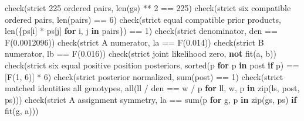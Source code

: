 \documentclass[
]{article}
\newenvironment{Shaded}{}{}
\newcommand{\BuiltInTok}[1]{\textcolor[rgb]{0.00,0.50,0.00}{#1}}
\newcommand{\ControlFlowTok}[1]{\textcolor[rgb]{0.00,0.44,0.13}{\textbf{#1}}}
\newcommand{\DecValTok}[1]{\textcolor[rgb]{0.25,0.63,0.44}{#1}}
\newcommand{\KeywordTok}[1]{\textcolor[rgb]{0.00,0.44,0.13}{\textbf{#1}}}
\newcommand{\NormalTok}[1]{#1}
\newcommand{\OperatorTok}[1]{\textcolor[rgb]{0.40,0.40,0.40}{#1}}
\newcommand{\StringTok}[1]{\textcolor[rgb]{0.25,0.44,0.63}{#1}}
\begin{document}
\begin{Shaded}
\begin{Highlighting}[]
\NormalTok{    check(}\StringTok{\textquotesingle{}strict 225 ordered pairs\textquotesingle{}}\NormalTok{, }\BuiltInTok{len}\NormalTok{(gs) }\OperatorTok{**} \DecValTok{2} \OperatorTok{==} \DecValTok{225}\NormalTok{)}
\NormalTok{    check(}\StringTok{\textquotesingle{}strict six compatible ordered pairs\textquotesingle{}}\NormalTok{, }\BuiltInTok{len}\NormalTok{(pairs) }\OperatorTok{==} \DecValTok{6}\NormalTok{)}
\NormalTok{    check(}\StringTok{\textquotesingle{}strict equal compatible prior products\textquotesingle{}}\NormalTok{,}
          \BuiltInTok{len}\NormalTok{(\{ps[i] }\OperatorTok{*}\NormalTok{ ps[j] }\ControlFlowTok{for}\NormalTok{ i, j }\KeywordTok{in}\NormalTok{ pairs\}) }\OperatorTok{==} \DecValTok{1}\NormalTok{)}
\NormalTok{    check(}\StringTok{\textquotesingle{}strict denominator\textquotesingle{}}\NormalTok{, den }\OperatorTok{==}\NormalTok{ F(}\StringTok{\textquotesingle{}0.0012096\textquotesingle{}}\NormalTok{))}
\NormalTok{    check(}\StringTok{\textquotesingle{}strict A numerator\textquotesingle{}}\NormalTok{, la }\OperatorTok{==}\NormalTok{ F(}\StringTok{\textquotesingle{}0.014\textquotesingle{}}\NormalTok{))}
\NormalTok{    check(}\StringTok{\textquotesingle{}strict B numerator\textquotesingle{}}\NormalTok{, lb }\OperatorTok{==}\NormalTok{ F(}\StringTok{\textquotesingle{}0.016\textquotesingle{}}\NormalTok{))}
\NormalTok{    check(}\StringTok{\textquotesingle{}strict joint likelihood zero\textquotesingle{}}\NormalTok{, }\KeywordTok{not}\NormalTok{ fit(a, b))}
\NormalTok{    check(}\StringTok{\textquotesingle{}strict six equal positive position posteriors\textquotesingle{}}\NormalTok{,}
          \BuiltInTok{sorted}\NormalTok{(p }\ControlFlowTok{for}\NormalTok{ p }\KeywordTok{in}\NormalTok{ post }\ControlFlowTok{if}\NormalTok{ p) }\OperatorTok{==}\NormalTok{ [F(}\DecValTok{1}\NormalTok{, }\DecValTok{6}\NormalTok{)] }\OperatorTok{*} \DecValTok{6}\NormalTok{)}
\NormalTok{    check(}\StringTok{\textquotesingle{}strict posterior normalized\textquotesingle{}}\NormalTok{, }\BuiltInTok{sum}\NormalTok{(post) }\OperatorTok{==} \DecValTok{1}\NormalTok{)}
\NormalTok{    check(}\StringTok{\textquotesingle{}strict matched identities all genotypes\textquotesingle{}}\NormalTok{,}
          \BuiltInTok{all}\NormalTok{(ll }\OperatorTok{/}\NormalTok{ den }\OperatorTok{==}\NormalTok{ w }\OperatorTok{/}\NormalTok{ p }\ControlFlowTok{for}\NormalTok{ ll, w, p }\KeywordTok{in} \BuiltInTok{zip}\NormalTok{(ls, post, ps)))}
\NormalTok{    check(}\StringTok{\textquotesingle{}strict A assignment symmetry\textquotesingle{}}\NormalTok{,}
\NormalTok{          la }\OperatorTok{==} \BuiltInTok{sum}\NormalTok{(p }\ControlFlowTok{for}\NormalTok{ g, p }\KeywordTok{in} \BuiltInTok{zip}\NormalTok{(gs, ps) }\ControlFlowTok{if}\NormalTok{ fit(g, a)))}

\end{Highlighting}
\end{Shaded}
\end{document}
